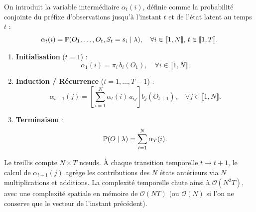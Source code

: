 \begin{proposition}
    On introduit la variable intermédiaire $\alpha_t(i)$, définie comme la probabilité conjointe du préfixe d'observations jusqu'à l'instant $t$ et de l'état latent au temps $t$ :
    \begin{equation}
        \alpha_t(i) = \mathbb{P}(O_1, \dots, O_t, S_t = s_i \mid \lambda), \quad \forall i \in \llbracket 1, N \rrbracket, \, t \in \llbracket 1, T \rrbracket.
    \end{equation}

    \begin{algorithm}[H]
    \caption{Algorithme Forward}
    \begin{enumerate}
        \item \textbf{Initialisation} ($t = 1$) :
        \begin{equation}
            \alpha_1(i) = \pi_i \, b_i(O_1), \quad \forall i \in \llbracket 1, N \rrbracket.
        \end{equation}
        \item \textbf{Induction / Récurrence} ($t = 1, \dots, T-1$) :
        \begin{equation}
            \alpha_{t+1}(j) = \left[ \sum_{i=1}^N \alpha_t(i) \, a_{ij} \right] b_j(O_{t+1}), \quad \forall j \in \llbracket 1, N \rrbracket.
        \end{equation}
        \item \textbf{Terminaison} :
        \begin{equation}
            \mathbb{P}(O \mid \lambda) = \sum_{i=1}^N \alpha_T(i).
        \end{equation}
    \end{enumerate}
    \end{algorithm}
\end{proposition}

\begin{remark}[Complexité]
    Le treillis compte $N \times T$ nœuds. À chaque transition temporelle $t \to t+1$, le calcul de $\alpha_{t+1}(j)$ agrège les contributions des $N$ états antérieurs via $N$ multiplications et additions. La complexité temporelle chute ainsi à $\mathcal{O}(N^2 T)$, avec une complexité spatiale en mémoire de $\mathcal{O}(N T)$ (ou $\mathcal{O}(N)$ si l'on ne conserve que le vecteur de l'instant précédent).
\end{remark}


